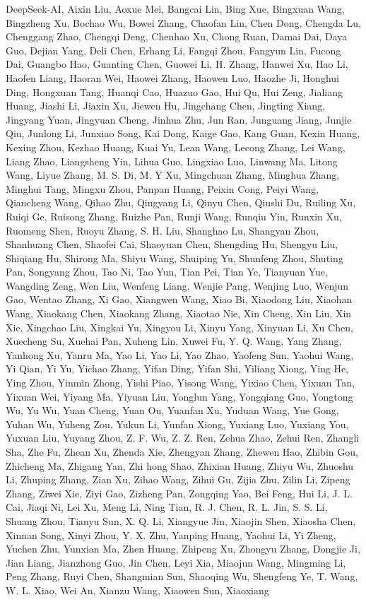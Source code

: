 \documentclass[
  10
]{article}
\begin{document}
DeepSeek-AI, Aixin Liu, Aoxue Mei, Bangcai Lin, Bing Xue, Bingxuan Wang,
Bingzheng Xu, Bochao Wu, Bowei Zhang, Chaofan Lin, Chen Dong, Chengda
Lu, Chenggang Zhao, Chengqi Deng, Chenhao Xu, Chong Ruan, Damai Dai,
Daya Guo, Dejian Yang, Deli Chen, Erhang Li, Fangqi Zhou, Fangyun Lin,
Fucong Dai, Guangbo Hao, Guanting Chen, Guowei Li, H. Zhang, Hanwei Xu,
Hao Li, Haofen Liang, Haoran Wei, Haowei Zhang, Haowen Luo, Haozhe Ji,
Honghui Ding, Hongxuan Tang, Huanqi Cao, Huazuo Gao, Hui Qu, Hui Zeng,
Jialiang Huang, Jiashi Li, Jiaxin Xu, Jiewen Hu, Jingchang Chen,
Jingting Xiang, Jingyang Yuan, Jingyuan Cheng, Jinhua Zhu, Jun Ran,
Junguang Jiang, Junjie Qiu, Junlong Li, Junxiao Song, Kai Dong, Kaige
Gao, Kang Guan, Kexin Huang, Kexing Zhou, Kezhao Huang, Kuai Yu, Lean
Wang, Lecong Zhang, Lei Wang, Liang Zhao, Liangsheng Yin, Lihua Guo,
Lingxiao Luo, Linwang Ma, Litong Wang, Liyue Zhang, M. S. Di, M. Y Xu,
Mingchuan Zhang, Minghua Zhang, Minghui Tang, Mingxu Zhou, Panpan Huang,
Peixin Cong, Peiyi Wang, Qiancheng Wang, Qihao Zhu, Qingyang Li, Qinyu
Chen, Qiushi Du, Ruiling Xu, Ruiqi Ge, Ruisong Zhang, Ruizhe Pan, Runji
Wang, Runqiu Yin, Runxin Xu, Ruomeng Shen, Ruoyu Zhang, S. H. Liu,
Shanghao Lu, Shangyan Zhou, Shanhuang Chen, Shaofei Cai, Shaoyuan Chen,
Shengding Hu, Shengyu Liu, Shiqiang Hu, Shirong Ma, Shiyu Wang, Shuiping
Yu, Shunfeng Zhou, Shuting Pan, Songyang Zhou, Tao Ni, Tao Yun, Tian
Pei, Tian Ye, Tianyuan Yue, Wangding Zeng, Wen Liu, Wenfeng Liang,
Wenjie Pang, Wenjing Luo, Wenjun Gao, Wentao Zhang, Xi Gao, Xiangwen
Wang, Xiao Bi, Xiaodong Liu, Xiaohan Wang, Xiaokang Chen, Xiaokang
Zhang, Xiaotao Nie, Xin Cheng, Xin Liu, Xin Xie, Xingchao Liu, Xingkai
Yu, Xingyou Li, Xinyu Yang, Xinyuan Li, Xu Chen, Xuecheng Su, Xuehai
Pan, Xuheng Lin, Xuwei Fu, Y. Q. Wang, Yang Zhang, Yanhong Xu, Yanru Ma,
Yao Li, Yao Li, Yao Zhao, Yaofeng Sun, Yaohui Wang, Yi Qian, Yi Yu,
Yichao Zhang, Yifan Ding, Yifan Shi, Yiliang Xiong, Ying He, Ying Zhou,
Yinmin Zhong, Yishi Piao, Yisong Wang, Yixiao Chen, Yixuan Tan, Yixuan
Wei, Yiyang Ma, Yiyuan Liu, Yonglun Yang, Yongqiang Guo, Yongtong Wu, Yu
Wu, Yuan Cheng, Yuan Ou, Yuanfan Xu, Yuduan Wang, Yue Gong, Yuhan Wu,
Yuheng Zou, Yukun Li, Yunfan Xiong, Yuxiang Luo, Yuxiang You, Yuxuan
Liu, Yuyang Zhou, Z. F. Wu, Z. Z. Ren, Zehua Zhao, Zehui Ren, Zhangli
Sha, Zhe Fu, Zhean Xu, Zhenda Xie, Zhengyan Zhang, Zhewen Hao, Zhibin
Gou, Zhicheng Ma, Zhigang Yan, Zhi hong Shao, Zhixian Huang, Zhiyu Wu,
Zhuoshu Li, Zhuping Zhang, Zian Xu, Zihao Wang, Zihui Gu, Zijia Zhu,
Zilin Li, Zipeng Zhang, Ziwei Xie, Ziyi Gao, Zizheng Pan, Zongqing Yao,
Bei Feng, Hui Li, J. L. Cai, Jiaqi Ni, Lei Xu, Meng Li, Ning Tian, R. J.
Chen, R. L. Jin, S. S. Li, Shuang Zhou, Tianyu Sun, X. Q. Li, Xiangyue
Jin, Xiaojin Shen, Xiaosha Chen, Xinnan Song, Xinyi Zhou, Y. X. Zhu,
Yanping Huang, Yaohui Li, Yi Zheng, Yuchen Zhu, Yunxian Ma, Zhen Huang,
Zhipeng Xu, Zhongyu Zhang, Dongjie Ji, Jian Liang, Jianzhong Guo, Jin
Chen, Leyi Xia, Miaojun Wang, Mingming Li, Peng Zhang, Ruyi Chen,
Shangmian Sun, Shaoqing Wu, Shengfeng Ye, T. Wang, W. L. Xiao, Wei An,
Xianzu Wang, Xiaowen Sun, Xiaoxiang
\end{document}
